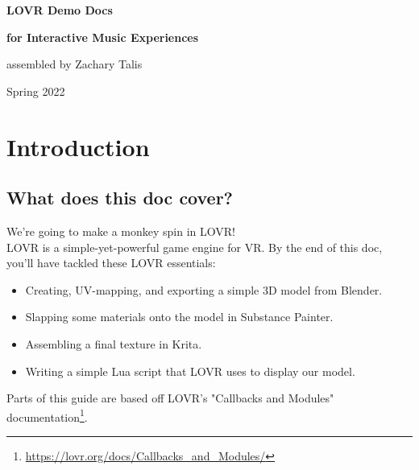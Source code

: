 \documentclass[12pt, letterpaper]{article}
\begin{document}
\begin{titlepage}
    \begin{center}

        \vspace*{5cm}

        \Large{\textbf{LOVR Demo Docs}}

        \vspace{-0.25cm}

        \Large{\textbf{for Interactive Music Experiences}}

        \vspace{0.5cm}

        \large{assembled by Zachary Talis}

        \vfill

        \small{Spring 2022}

    \end{center}
\end{titlepage}

\tableofcontents
\newpage

\section{Introduction}

\subsection{What does this doc cover?}
We're going to make a monkey spin in LOVR!\\
LOVR is a simple-yet-powerful game engine for VR. By the end of this doc, you'll have tackled these LOVR essentials:
\begin{itemize}
    \item Creating, UV-mapping, and exporting a simple 3D model from Blender.
    \item Slapping some materials onto the model in Substance Painter.
    \item Assembling a final texture in Krita.
    \item Writing a simple Lua script that LOVR uses to display our model.
\end{itemize}
Parts of this guide are based off LOVR's "Callbacks and Modules" documentation\footnote{\url{https://lovr.org/docs/Callbacks_and_Modules/}}.
\end{document}
